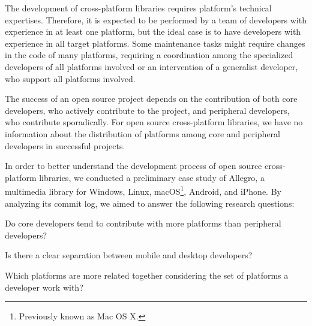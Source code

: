 \documentclass[10pt, conference]{IEEEtran}
\begin{document}
The development of cross-platform libraries requires platform's technical expertises. Therefore, it is expected to be performed by a team of developers with experience in at least one platform, but the ideal case is to have developers with experience in all target platforms. Some maintenance tasks might require changes in the code of many platforms, requiring a coordination among the specialized developers of all platforms involved or an intervention of a generalist developer, who support all platforms involved. 

The success of an open source project depends on the contribution of both core developers, who actively contribute to the project, and peripheral developers, who contribute sporadically. For open source cross-platform libraries, we have no information about the distribution of platforms among core and peripheral developers in successful projects.


In order to better understand the development process of open source cross-platform libraries, we conducted a preliminary case study of Allegro, a multimedia library for Windows, Linux, macOS\footnote{Previously known as Mac OS X.}, Android, and iPhone. By analyzing its commit log, we aimed to answer the following research questions:


\begin{RQ}
\item Do core developers tend to contribute with more platforms than peripheral developers?
\item Is there a clear separation between mobile and desktop developers?
\item  Which platforms are more related together considering the set of platforms a developer work with? 
\end{RQ}
\end{document}
